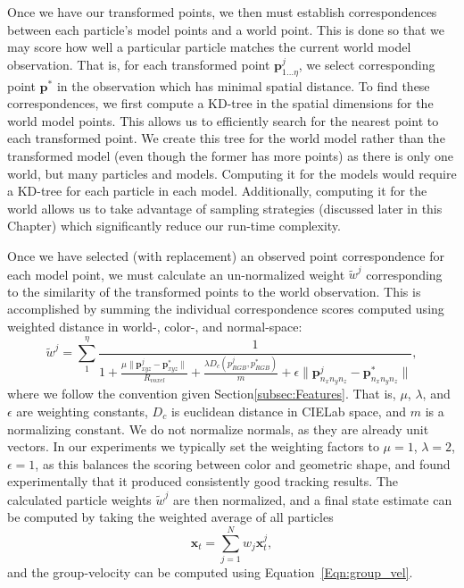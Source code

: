 Once we have our transformed points, we then must establish correspondences between each particle's model points and a world point. This is done so that we may score how well a particular particle matches the current world model observation. That is, for each transformed point $\mathbf{p}^j_{1\dotso \eta}$, we select corresponding point $\mathbf{p}^*$ in the observation which has minimal spatial distance.
To find these correspondences, we first compute a KD-tree in the spatial dimensions for the world model points. This allows us to efficiently search for the nearest point to each transformed point. We create this tree for the world model rather than the transformed model (even though the former has more points) as there is only one world, but many particles and models. Computing it for the models would require a KD-tree for each particle in each model. Additionally, computing it for the world allows us to take advantage of sampling strategies (discussed later in this Chapter) which significantly reduce our run-time complexity. 

Once we have selected (with replacement) an observed point correspondence for each model point, we must calculate an un-normalized weight $\tilde{w}^j$ corresponding to the similarity of the transformed points to the world observation. This is accomplished   by summing the individual correspondence scores computed using weighted distance in world-, color-, and normal-space:
\begin{equation} \label{eqn:distance}
  \tilde{w}^j = \sum_{1}^{\eta} \frac{1}{1 + \frac {\mu \lVert \mathbf{p}^j_{xyz} - \mathbf{p}^*_{xyz} \rVert} {R_{voxel}} +  \frac{\lambda D_c(p^j_{RGB},p^*_{RGB})}{m} +   \epsilon \lVert \mathbf{p}^j_{n_x n_y n_z} - \mathbf{p}^*_{n_x n_y n_z} \rVert}, 
\end{equation}
where we follow the convention given Section\ref{subsec:Features}. That is, $\mu$, $\lambda$, and $\epsilon$ are weighting constants, $D_c$ is euclidean distance in CIELab space, and $m$ is a normalizing constant. We do not normalize normals, as they are already unit vectors. In our experiments we typically set the weighting factors to $\mu=1$, $\lambda=2$, $\epsilon=1$, as this balances the scoring between color and geometric shape, and found experimentally that it produced consistently good tracking results. The calculated particle weights $\tilde{w}^j$ are then normalized, and a final state estimate can be computed by taking the weighted average of all particles
\begin{equation} 
\mathbf{x}_t = \sum_{j=1}^{N} w_j \mathbf{x}^j_{t}, 
\end{equation}
and the group-velocity can be computed using Equation~\ref{Eqn:group_vel}.

